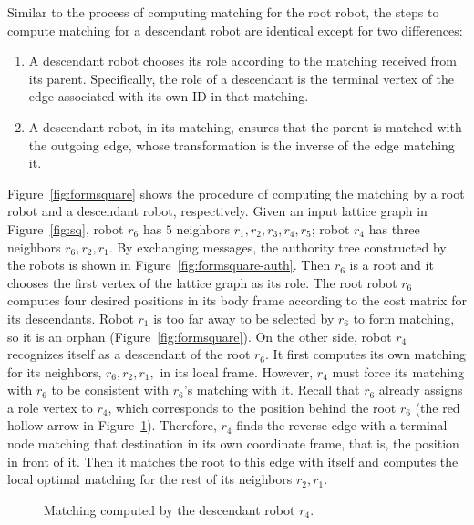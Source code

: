 Similar to the process of computing matching for the root robot, the steps to compute matching for a descendant robot are identical except for two differences:
\begin{enumerate}
\item A descendant robot chooses its role according to the matching received from its parent.  
%
    Specifically, the role of a descendant is the terminal vertex of
  the edge associated with its own ID in that matching. 
\item A descendant robot, in its matching, ensures that the parent is
  matched with the outgoing edge, whose transformation is the inverse of the edge matching it.
\end{enumerate}

Figure~\ref{fig:formsquare} shows the procedure of computing the matching by a root robot and a descendant robot, respectively. 
%
Given an input lattice graph in Figure~\ref{fig:sq}, robot $r_6$ has $5$ neighbors $r_1, r_2, r_3, r_4, r_5$; robot $r_4$ has three neighbors $r_6, r_2, r_1$. 
%
By exchanging messages, the authority tree constructed by the robots is shown in Figure~\ref{fig:formsquare-auth}.
%
Then $r_6$ is a root and it chooses the first vertex of the lattice graph as its role.
%
The root robot $r_6$ computes four desired positions in its body frame according to the cost matrix for its descendants.
%
Robot $r_1$ is too far away to be selected by $r_6$ to form matching, so it is an orphan (Figure~\ref{fig:formsquare}).
%
On the other side, robot $r_4$ recognizes itself as a descendant of the root $r_6$.
%
It first computes its own matching for its neighbors, $r_6, r_2, r_1,$ in its local frame. 
%
However, $r_4$ must force its matching with $r_6$ to be consistent with $r_6$'s matching with it.
%
Recall that $r_6$ already assigns a role vertex to $r_4$, which corresponds to the position behind the root $r_6$ (the red hollow arrow in Figure~\ref{fig:formsquare-des}).
%
Therefore, $r_4$ finds the reverse edge with a terminal node matching that destination in its own coordinate frame, that is, the position in front of it. 
%
Then it matches the root to this edge with itself and computes the local optimal matching for the rest of its neighbors $r_2, r_1$.

\begin{figure}
    \centering
    \begin{minipage}{0.9\textwidth}
    \centering
    
    \end{minipage}
    \caption{Matching computed by the descendant robot $r_4$.}
    \label{fig:formsquare-des}
\end{figure}

